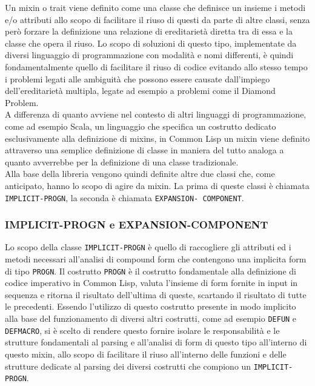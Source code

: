 Un mixin o trait viene definito come una classe che definisce un insieme i
metodi e/o attributi allo scopo di facilitare il riuso di questi da parte di
altre classi, senza però forzare la definizione una relazione di ereditarietà
diretta tra di essa e la classe che opera il riuso. Lo scopo di soluzioni di
questo tipo, implementate da diversi linguaggio di programmazione con modalità
e nomi differenti, è quindi fondamentalmente quello di facilitare il riuso di
codice evitando allo stesso tempo i problemi legati alle ambiguità che possono
essere causate dall’impiego dell’ereditarietà multipla, legate ad esempio a
problemi come il Diamond Problem\cite{martin1997}.\\

A differenza di quanto avviene nel contesto di altri linguaggi di
programmazione, come ad esempio Scala, un linguaggio che specifica un
costrutto dedicato esclusivamente alla definizione di mixins, in Common Lisp
un mixin viene definito attraverso una semplice definizione di classe in
maniera del tutto analoga a quanto avverrebbe per la definizione di una classe
tradizionale.\\

Alla base della libreria vengono quindi definite altre due classi che, come
anticipato, hanno lo scopo di agire da mixin. La prima di queste classi è
chiamata \texttt{IMPLICIT-PROGN}, la seconda è chiamata \texttt {EXPANSION-
COMPONENT}.

\subsubsection{IMPLICIT-PROGN e EXPANSION-COMPONENT}

Lo scopo della classe \texttt{IMPLICIT-PROGN} è quello di raccogliere gli
attributi ed i metodi necessari all’analisi di compound form che contengono
una implicita form di tipo \texttt{PROGN}. Il costrutto \texttt{PROGN} è il
costrutto fondamentale alla definizione di codice imperativo in Common Lisp,
valuta l’insieme di form fornite in input in sequenza e ritorna il risultato
dell’ultima di queste, scartando il risultato di tutte le precedenti. Essendo
l’utilizzo di questo costrutto presente in modo implicito alla base del
funzionamento di diversi altri costrutti, come ad esempio \texttt{DEFUN} e
\texttt{DEFMACRO}, si è scelto di rendere questo fornire isolare le
responsabilità e le strutture fondamentali al parsing e all’analisi di form di
questo tipo all’interno di questo mixin, allo scopo di facilitare il riuso
all’interno delle funzioni e delle strutture dedicate al parsing dei diversi
costrutti che compiono un \texttt{IMPLICIT-PROGN}.


